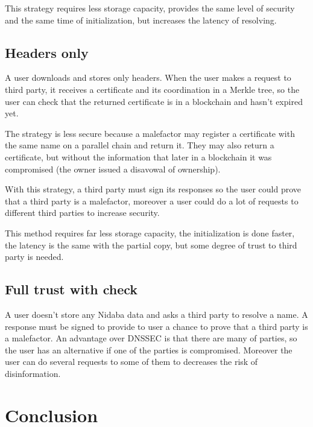 \documentclass[12pt]{article}
\begin{document}
This strategy requires less storage capacity, provides the same level of security and the same time of initialization, but increases the latency of resolving.

\subsection{Headers only}
A user downloads and stores only headers. When the user makes a request to third party, it receives a certificate and its coordination in a Merkle tree, so the user can check that the returned certificate is in a blockchain and hasn't expired yet.

The strategy is less secure because a malefactor may register a certificate with the same name on a parallel chain and return it. They may also return a certificate, but without the information that later in a blockchain it was compromised (the owner issued a disavowal of ownership).

With this strategy, a third party must sign its responses so the user could prove that a third party is a malefactor, moreover a user could do a lot of requests to different third parties to increase security.

This method requires far less storage capacity, the initialization is done faster, the latency is the same with the partial copy, but some degree of trust to third party is needed.

\subsection{Full trust with check}
A user doesn't store any Nidaba data and asks a third party to resolve a name. A response must be signed to provide to user a chance to prove that a third party is a malefactor. An  advantage over DNSSEC is that there are many of parties, so the user has an alternative if one of the parties is compromised. Moreover the user can do several requests to some of them to decreases the risk of disinformation.

\section{Conclusion}
\end{document}
